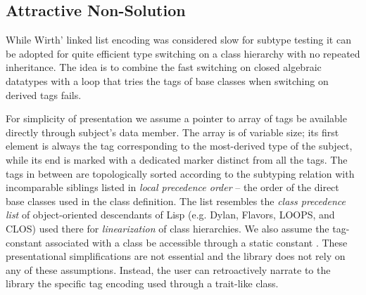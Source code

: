 \subsection{Attractive Non-Solution}
\label{sec:cotc}



While Wirth' linked list encoding was considered slow for subtype testing it can 
be adopted for quite efficient type switching on a class hierarchy with no 
repeated inheritance. The idea is to combine the fast switching on closed 
algebraic datatypes with a loop that tries the tags of base classes when 
switching on derived tags fails.


For simplicity of presentation we assume a pointer to array of tags be available 
directly through subject's  data member. The array is of 
variable size; its first element is always the tag corresponding to the 
most-derived type of the subject, while its end is marked with a dedicated 
 marker distinct from all the tags. The tags in between are 
topologically sorted according to the subtyping relation with incomparable 
siblings listed in \emph{local precedence order} -- the order of the direct base 
classes used in the class definition. The list resembles the \emph{class 
precedence list} of object-oriented descendants of Lisp (e.g. Dylan, Flavors, 
LOOPS, and CLOS) used there for \emph{linearization} of class hierarchies.
We also assume the tag-constant associated with a class 
 be accessible through a static constant . These presentational
simplifications are not essential and the library does not rely on any of these 
assumptions. Instead, the user can retroactively narrate to the library the 
specific tag encoding used through a trait-like class.

